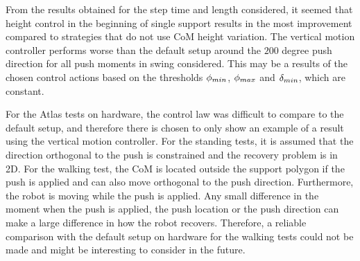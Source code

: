 From the results obtained for the step time and length considered, it seemed that height control in the beginning of single support results in the most improvement compared to strategies that do not use \ac{CoM} height variation. The vertical motion controller performs worse than the default setup around the $200$ degree push direction for all push moments in swing considered. This may be a results of the chosen control actions based on the thresholds $\phi_{min}$, $\phi_{max}$ and $\delta_{min}$, which are constant.

For the Atlas tests on hardware, the control law was difficult to compare to the default setup, and therefore there is chosen to only show an example of a result using the vertical motion controller. For the standing tests, it is assumed that the direction orthogonal to the push is constrained and the recovery problem is in \ac{2D}. For the walking test, the \ac{CoM} is located outside the support polygon if the push is applied and can also move orthogonal to the push direction. Furthermore, the robot is moving while the push is applied. Any small difference in the moment when the push is applied, the push location or the push direction can make a large difference in how the robot recovers. Therefore, a reliable comparison with the default setup on hardware for the walking tests could not be made and might be interesting to consider in the future. 
